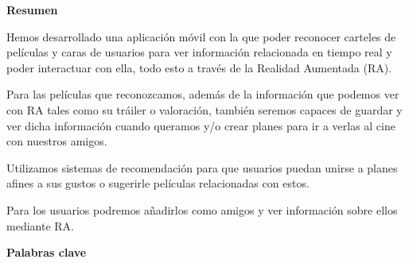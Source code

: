 
\newpage

\thispagestyle{empty}

\begin{center}

{\bf \Huge Resumen}

  \end{center}
\vspace{1cm}

Hemos desarrollado una aplicación móvil con la que poder
 reconocer carteles de películas y caras de usuarios para
 ver información relacionada en tiempo real y poder
 interactuar con ella, todo esto a través de la Realidad
 Aumentada (RA).

Para las películas que reconozcamos, además de la información
 que podemos ver con RA tales como su tráiler o valoración,
 también seremos capaces de guardar y ver dicha información
 cuando queramos y/o crear planes para ir a verlas al cine
 con nuestros amigos.

Utilizamos sistemas de recomendación para que usuarios puedan
 unirse a planes afines a sus gustos o sugerirle películas
 relacionadas con estos.

Para los usuarios podremos añadirlos como amigos y ver
 información sobre ellos mediante RA.


\vspace{1cm}


\begin{center}

{\bf \Large Palabras clave}

   \end{center}

   \vspace{0.5cm}
   
